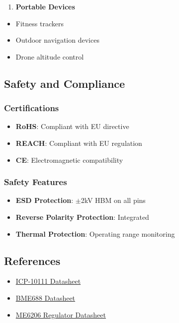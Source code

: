 \documentclass[11pt,a4paper]{article}
\begin{document}
\begin{enumerate}
\item \textbf{Portable Devices}
\end{enumerate}
\begin{itemize}
\item Fitness trackers
\item Outdoor navigation devices
\item Drone altitude control
\end{itemize}

\subsection{Safety and Compliance}

\subsubsection{Certifications}
\begin{itemize}
\item \textbf{RoHS}: Compliant with EU directive
\item \textbf{REACH}: Compliant with EU regulation
\item \textbf{CE}: Electromagnetic compatibility
\end{itemize}

\subsubsection{Safety Features}
\begin{itemize}
\item \textbf{ESD Protection}: $\pm$2kV HBM on all pins
\item \textbf{Reverse Polarity Protection}: Integrated
\item \textbf{Thermal Protection}: Operating range monitoring
\end{itemize}

\subsection{References}

\begin{itemize}
\item \href{https://product.tdk.com/system/files/dam/doc/product/sensor/pressure/capacitive-pressure/data_sheet/ds-000177-icp-10111-v1.3.pdf}{ICP-10111 Datasheet}
\item \href{https://www.bosch-sensortec.com/media/boschsensortec/downloads/datasheets/bst-bme688-ds000.pdf}{BME688 Datasheet}
\item \href{https://www.microne.com.cn/uploads/file/20200904/ME6206.pdf}{ME6206 Regulator Datasheet}
\end{itemize}
\end{document}
